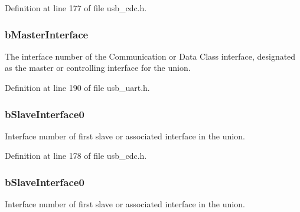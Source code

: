 Definition at line 177 of file usb\-\_\-cdc.\-h.

\hypertarget{struct_u_s_b___union___functional___descriptor_a38161403ddd7bcc7d1cd008d6d78139d}{
\subsubsection[{b\-Master\-Interface}]{ b\-Master\-Interface}}\label{struct_u_s_b___union___functional___descriptor_a38161403ddd7bcc7d1cd008d6d78139d}
The interface number of the Communication or Data Class interface, designated as the master or controlling interface for the union. 

Definition at line 190 of file usb\-\_\-uart.\-h.

\hypertarget{struct_u_s_b___union___functional___descriptor_a0329be90e8ea172f2fa8c0e14ff4e95f}{
\subsubsection[{b\-Slave\-Interface0}]{ b\-Slave\-Interface0}}\label{struct_u_s_b___union___functional___descriptor_a0329be90e8ea172f2fa8c0e14ff4e95f}
Interface number of first slave or associated interface in the union. 

Definition at line 178 of file usb\-\_\-cdc.\-h.

\hypertarget{struct_u_s_b___union___functional___descriptor_a649dbf17f4722360bbc65565714a613e}{
\subsubsection[{b\-Slave\-Interface0}]{ b\-Slave\-Interface0}}\label{struct_u_s_b___union___functional___descriptor_a649dbf17f4722360bbc65565714a613e}
Interface number of first slave or associated interface in the union. 

